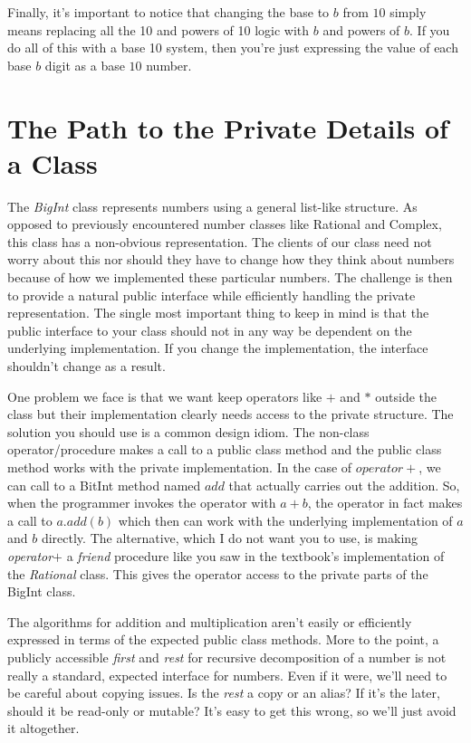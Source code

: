 \documentclass[10pt]{article}
\begin{document}
Finally, it's important to notice that changing the base to $b$ from $10$ simply means replacing all the 10 and powers of 10 logic with $b$ and powers of $b$. If you do all of this with a base 10 system, then you're just expressing the value of each base $b$ digit as a base $10$ number.

\section{The Path to the Private Details of a Class}

The \textit{BigInt} class represents numbers using a general list-like structure. As opposed to previously encountered number classes like Rational and Complex, this class has a non-obvious representation. The clients of our class need not worry about this nor should they have to change how they think about numbers because of how we implemented these particular numbers. The challenge is then to provide a natural public interface while efficiently handling the private representation. The single most important thing to keep in mind is that the public interface to your class should not in any way be dependent on the underlying implementation. If you change the implementation, the interface shouldn't change as a result.

One problem we face is that we want keep operators like $+$ and $*$ outside the class but their implementation clearly needs access to the private structure. The solution you should use is a common design idiom. The non-class operator/procedure makes a call to a public class method and the public class method works with the private implementation. In the case of $operator+$, we can call to a BitInt method named $add$ that actually carries out the addition. So, when the programmer invokes the operator with $a + b$, the operator in fact makes a call to $a.add(b)$ which then can work with the underlying implementation of $a$ and $b$ directly.  The alternative, which I do not want you to use, is making \textit{operator$+$} a \textit{friend} procedure like you saw in the textbook's implementation of the \textit{Rational} class. This gives the operator access to the private parts of the BigInt class.

The algorithms for addition and multiplication aren't easily or efficiently expressed in terms of the expected public class methods. More to the point, a publicly accessible \textit{first} and \textit{rest} for recursive decomposition of a number is not really a standard, expected interface for numbers. Even if it were, we'll need to be careful about copying issues.  Is the \textit{rest} a copy or an alias? If it's the later, should it be read-only or mutable? It's easy to get this wrong, so we'll just avoid it altogether.
\end{document}
